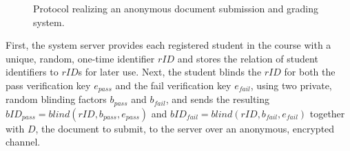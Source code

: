 \begin{figure}[h!]
\begin{msc}{}
				\nextlevel[1]

				\nextlevel[3]

				\nextlevel[1]
		\nextlevel[1.5]

		\nextlevel[1]

		\nextlevel[3.5]

		\nextlevel[1]

		\nextlevel[3.5]

	\end{msc}

	\caption{Protocol realizing an anonymous document submission and grading system.} 
	\label{figure:document-submission-system:sequencediagram}
\end{figure}%
%
First, the system server provides each registered student in the course
with a unique, random, one-time identifier $rID$ and stores the relation
of student identifiers to $rID$s for later use.
Next, the student blinds the $rID$ for both the pass verification key
$e_{pass}$ and the fail verification key $e_{fail}$, using two private,
random blinding factors $b_{pass}$ and $b_{fail}$, and sends the
resulting $bID_{pass} = blind(rID,b_{pass},e_{pass})$ and $bID_{fail} =
blind(rID,b_{fail},e_{fail})$ together with $D$, the document to submit,
to the server over an anonymous, encrypted channel. %
